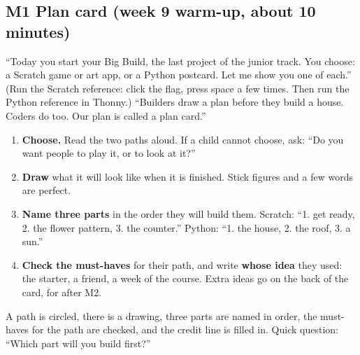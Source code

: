 \documentclass[track=junior,level=3,teacher]{kidscode}
\begin{document}
\subsection{M1 Plan card (week 9 warm-up, about 10 minutes)}
\begin{teacherscript}
\enquote{Today you start your Big Build, the last project of the junior track. You choose: a Scratch
game or art app, or a Python postcard. Let me show you one of each.} (Run the Scratch reference: click
the flag, press space a few times. Then run the Python reference in Thonny.) \enquote{Builders draw a
plan before they build a house. Coders do too. Our plan is called a plan card.}
\end{teacherscript}
\begin{enumerate}[itemsep=2pt]
  \item \textbf{Choose.} Read the two paths aloud. If a child cannot choose, ask: \enquote{Do you want
        people to play it, or to look at it?}
  \item \textbf{Draw} what it will look like when it is finished. Stick figures and a few words are perfect.
  \item \textbf{Name three parts} in the order they will build them. Scratch: \enquote{1. get ready,
        2. the flower pattern, 3. the counter.} Python: \enquote{1. the house, 2. the roof, 3. a sun.}
  \item \textbf{Check the must-haves} for their path, and write \textbf{whose idea} they used: the starter,
        a friend, a week of the course. Extra ideas go on the back of the card, for after M2.
\end{enumerate}
\begin{formativecheck}
A path is circled, there is a drawing, three parts are named in order, the must-haves for the path are
checked, and the credit line is filled in. Quick question: \enquote{Which part will you build first?}
\end{formativecheck}
\end{document}
